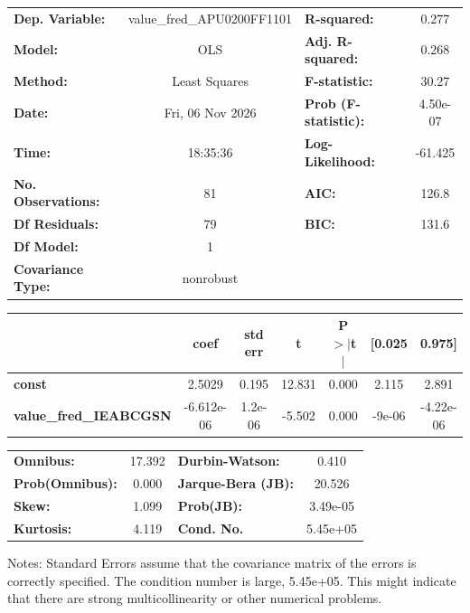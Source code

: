 \begin{center}
\begin{tabular}{lclc}
\toprule
\textbf{Dep. Variable:}        & value\_fred\_APU0200FF1101 & \textbf{  R-squared:         } &     0.277   \\
\textbf{Model:}                &            OLS             & \textbf{  Adj. R-squared:    } &     0.268   \\
\textbf{Method:}               &       Least Squares        & \textbf{  F-statistic:       } &     30.27   \\
\textbf{Date:}                 &      Fri, 06 Nov 2026      & \textbf{  Prob (F-statistic):} &  4.50e-07   \\
\textbf{Time:}                 &          18:35:36          & \textbf{  Log-Likelihood:    } &   -61.425   \\
\textbf{No. Observations:}     &               81           & \textbf{  AIC:               } &     126.8   \\
\textbf{Df Residuals:}         &               79           & \textbf{  BIC:               } &     131.6   \\
\textbf{Df Model:}             &                1           & \textbf{                     } &             \\
\textbf{Covariance Type:}      &         nonrobust          & \textbf{                     } &             \\
\bottomrule
\end{tabular}
\begin{tabular}{lcccccc}
                               & \textbf{coef} & \textbf{std err} & \textbf{t} & \textbf{P$> |$t$|$} & \textbf{[0.025} & \textbf{0.975]}  \\
\midrule
\textbf{const}                 &       2.5029  &        0.195     &    12.831  &         0.000        &        2.115    &        2.891     \\
\textbf{value\_fred\_IEABCGSN} &   -6.612e-06  &      1.2e-06     &    -5.502  &         0.000        &       -9e-06    &    -4.22e-06     \\
\bottomrule
\end{tabular}
\begin{tabular}{lclc}
\textbf{Omnibus:}       & 17.392 & \textbf{  Durbin-Watson:     } &    0.410  \\
\textbf{Prob(Omnibus):} &  0.000 & \textbf{  Jarque-Bera (JB):  } &   20.526  \\
\textbf{Skew:}          &  1.099 & \textbf{  Prob(JB):          } & 3.49e-05  \\
\textbf{Kurtosis:}      &  4.119 & \textbf{  Cond. No.          } & 5.45e+05  \\
\bottomrule
\end{tabular}
\end{center}

Notes: \newline
 [1] Standard Errors assume that the covariance matrix of the errors is correctly specified. \newline
 [2] The condition number is large, 5.45e+05. This might indicate that there are \newline
 strong multicollinearity or other numerical problems.